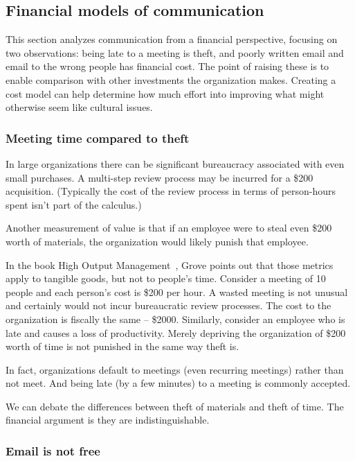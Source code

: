 \subsection*{Financial models of communication}

This section analyzes communication from a financial perspective, focusing on two observations:
being late to a meeting is theft, 
and poorly written email and email to the wrong people has financial cost.
The point of raising these is to enable comparison with other investments the organization makes. Creating a cost model can help determine how much effort into improving what might otherwise seem like cultural issues.

\subsubsection*{Meeting time compared to theft}

In large organizations there can be significant bureaucracy associated with even small purchases. A multi-step review process may be incurred for a \$200 acquisition. (Typically the cost of the review process in terms of person-hours spent isn't part of the calculus.)

Another measurement of value is that if an employee were to steal even \$200 worth of materials, the organization would likely punish that employee.

In the book High Output Management~\cite{1995_Grove}, Grove points out that those metrics apply to tangible goods, but not to people's time. Consider a meeting of 10 people and each person's cost is \$200 per hour. 
A wasted meeting is not unusual and certainly would not incur bureaucratic review processes. The cost to the organization is fiscally the same -- \$2000. Similarly, consider an employee who is late and causes a loss of productivity. Merely depriving the organization of \$200 worth of time is not punished in the same way theft is.

In fact, organizations default to meetings (even recurring meetings) rather than not meet. And being late (by a few minutes) to a meeting is commonly accepted. 

We can debate the differences between theft of materials and theft of time. The financial argument is they are indistinguishable. 


\subsubsection*{Email is not free}

